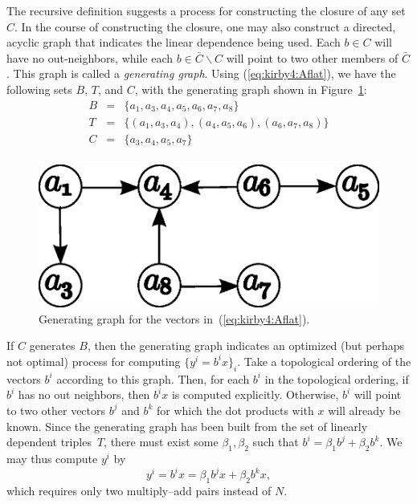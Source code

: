 The recursive definition suggests a process for constructing the
closure of any set \( C \).  In the course of constructing the
closure, one may also construct a directed, acyclic graph that
indicates the linear dependence being used.  Each \( b \in C \) will
have no out-neighbors, while each \( b \in \bar{C} \backslash C \)
will point to two other members of \( \bar{C} \).  This graph is
called a \emph{generating graph}. Using (\ref{eq:kirby4:Aflat}), we
have the following sets $B$, $T$, and $C$, with the generating graph
shown in Figure~\ref{fig:kirby4:gg}:
\begin{displaymath}
\begin{array}{rcl}
 B & = &  \{a_1, a_3, a_4, a_5, a_6, a_7, a_8\} \\
 T & = & \{(a_1, a_3, a_4),(a_4, a_5, a_6), (a_6, a_7, a_8)\} \\
 C & = & \{a_3, a_4, a_5, a_7\} \\
\end{array}
\end{displaymath}

\begin{figure}
  \begin{center}
 \includegraphics[width=\smallwidth]{chapters/kirby-4/eps/gg2.eps}
  \caption{Generating graph for the vectors in~(\ref{eq:kirby4:Aflat}).}
  \label{fig:kirby4:gg}
  \end{center}
\end{figure}

If $C$ generates \( B \), then the generating graph indicates an
optimized (but perhaps not optimal) process for computing \( \{ y^i =
b^i x \}_i\).  Take a topological ordering of the vectors \( b^i \)
according to this graph.  Then, for each \( b^i \) in the topological
ordering, if \( b^i \) has no out neighbors, then \( b^i x \) is
computed explicitly.  Otherwise, \( b^i \) will point to two other
vectors \( b^j \) and \( b^k \) for which the dot products with \( x
\) will already be known. Since the generating graph has been built
from the set of linearly dependent triples~$T$, there must exist some
\( \beta_1, \beta_2 \) such that \( b^i = \beta_1 b^j + \beta_2 b^k
\). We may thus compute $y^i$ by
\[
y^i = b^i x = \beta_1 b^j x
+ \beta_2  b^k  x,
\]
which requires only two multiply--add pairs instead of \( N \).

